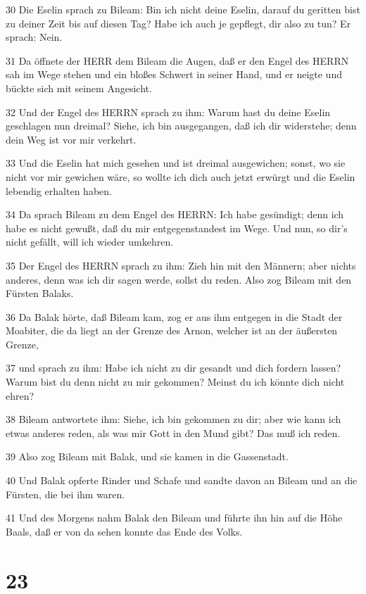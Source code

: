\par 30 Die Eselin sprach zu Bileam: Bin ich nicht deine Eselin, darauf du geritten bist zu deiner Zeit bis auf diesen Tag? Habe ich auch je gepflegt, dir also zu tun? Er sprach: Nein.
\par 31 Da öffnete der HERR dem Bileam die Augen, daß er den Engel des HERRN sah im Wege stehen und ein bloßes Schwert in seiner Hand, und er neigte und bückte sich mit seinem Angesicht.
\par 32 Und der Engel des HERRN sprach zu ihm: Warum hast du deine Eselin geschlagen nun dreimal? Siehe, ich bin ausgegangen, daß ich dir widerstehe; denn dein Weg ist vor mir verkehrt.
\par 33 Und die Eselin hat mich gesehen und ist dreimal ausgewichen; sonst, wo sie nicht vor mir gewichen wäre, so wollte ich dich auch jetzt erwürgt und die Eselin lebendig erhalten haben.
\par 34 Da sprach Bileam zu dem Engel des HERRN: Ich habe gesündigt; denn ich habe es nicht gewußt, daß du mir entgegenstandest im Wege. Und nun, so dir's nicht gefällt, will ich wieder umkehren.
\par 35 Der Engel des HERRN sprach zu ihm: Zieh hin mit den Männern; aber nichts anderes, denn was ich dir sagen werde, sollst du reden. Also zog Bileam mit den Fürsten Balaks.
\par 36 Da Balak hörte, daß Bileam kam, zog er aus ihm entgegen in die Stadt der Moabiter, die da liegt an der Grenze des Arnon, welcher ist an der äußersten Grenze,
\par 37 und sprach zu ihm: Habe ich nicht zu dir gesandt und dich fordern lassen? Warum bist du denn nicht zu mir gekommen? Meinst du ich könnte dich nicht ehren?
\par 38 Bileam antwortete ihm: Siehe, ich bin gekommen zu dir; aber wie kann ich etwas anderes reden, als was mir Gott in den Mund gibt? Das muß ich reden.
\par 39 Also zog Bileam mit Balak, und sie kamen in die Gassenstadt.
\par 40 Und Balak opferte Rinder und Schafe und sandte davon an Bileam und an die Fürsten, die bei ihm waren.
\par 41 Und des Morgens nahm Balak den Bileam und führte ihn hin auf die Höhe Baals, daß er von da sehen konnte das Ende des Volks.

\chapter{23}

